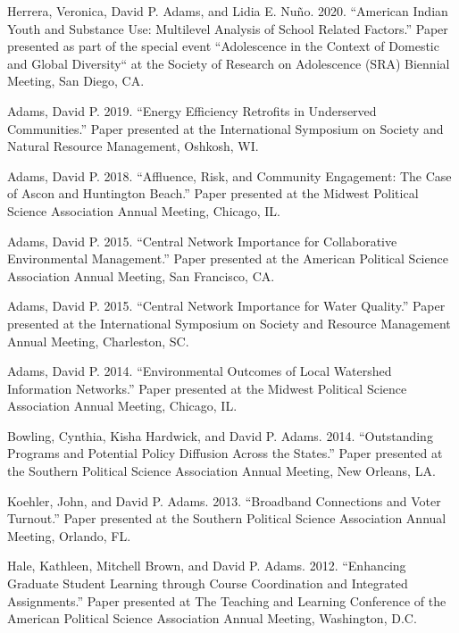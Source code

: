 \documentclass[12pt,letterpaper]{article}
\renewenvironment{itemize}{
  \begin{list}{}{
    \setlength{\leftmargin}{1.5em}
    \setlength{\itemsep}{0.25em}
    \setlength{\parskip}{0pt}
    \setlength{\parsep}{0.25em}
  }
}{
  \end{list}
}
\begin{document}
\begin{itemize}
    \item Herrera, Veronica, David P. Adams, and Lidia E. Nuño. 2020. ``American Indian Youth and Substance Use: Multilevel Analysis of School Related Factors.'' Paper presented as part of the special event ``Adolescence in the Context of Domestic and Global Diversity`` at the Society of Research on Adolescence (SRA) Biennial Meeting, San Diego, CA.
    
    \item Adams, David P. 2019. ``Energy Efficiency Retrofits in Underserved Communities.'' Paper presented at the International Symposium on Society and Natural Resource Management, Oshkosh, WI.
    
    \item Adams, David P. 2018. ``Affluence, Risk, and Community Engagement: The Case of Ascon and Huntington Beach.'' Paper presented at the Midwest Political Science Association Annual Meeting, Chicago, IL.
    
    \item Adams, David P. 2015. ``Central Network Importance for Collaborative Environmental Management.'' Paper presented at the American Political Science Association Annual Meeting, San Francisco, CA.
    
    \item Adams, David P. 2015. ``Central Network Importance for Water Quality.'' Paper presented at the International Symposium on Society and Resource Management Annual Meeting, Charleston, SC.
    
    \item Adams, David P. 2014. ``Environmental Outcomes of Local Watershed Information Networks.'' Paper presented at the Midwest Political Science Association Annual Meeting, Chicago, IL.
    
    \item Bowling, Cynthia, Kisha Hardwick, and David P. Adams. 2014. ``Outstanding Programs and Potential Policy Diffusion Across the States.'' Paper presented at the Southern Political Science Association Annual Meeting, New Orleans, LA.
    
    \item Koehler, John, and David P. Adams. 2013. ``Broadband Connections and Voter Turnout.'' Paper presented at the Southern Political Science Association Annual Meeting, Orlando, FL.
    
    \item Hale, Kathleen, Mitchell Brown, and David P. Adams. 2012. ``Enhancing Graduate Student Learning through Course Coordination and Integrated Assignments.'' Paper presented at The Teaching and Learning Conference of the American Political Science Association Annual Meeting, Washington, D.C.
    

\end{itemize}
\end{document}
